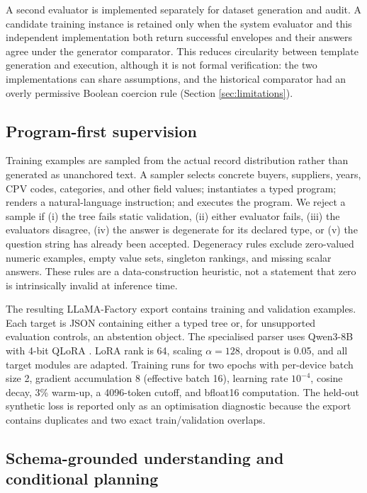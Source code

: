 A second evaluator is implemented separately for dataset generation and audit.  A candidate
training instance is retained only when the system evaluator and this independent implementation
both return successful envelopes and their answers agree under the generator comparator.  This
reduces circularity between template generation and execution, although it is not formal
verification: the two implementations can share assumptions, and the historical comparator had
an overly permissive Boolean coercion rule (Section \ref{sec:limitations}).

\subsection{Program-first supervision}
\label{sec:program-supervision}

Training examples are sampled from the actual record distribution rather than generated as
unanchored text.  A sampler selects concrete buyers, suppliers, years, CPV codes, categories, and
other field values; instantiates a typed program; renders a natural-language instruction; and
executes the program.  We reject a sample if (i) the tree fails static validation, (ii) either
evaluator fails, (iii) the evaluators disagree, (iv) the answer is degenerate for its declared
type, or (v) the question string has already been accepted.  Degeneracy rules exclude zero-valued
numeric examples, empty value sets, singleton rankings, and missing scalar answers.  These rules
are a data-construction heuristic, not a statement that zero is intrinsically invalid at
inference time.

The resulting LLaMA-Factory export contains \TrainN training and \ValN validation examples.
Each target is JSON containing either a typed tree or, for unsupported evaluation controls, an
abstention object.  The specialised parser uses Qwen3-8B \citep{yang2025qwen3} with 4-bit QLoRA
\citep{dettmers2023qlora}.  LoRA rank is 64, scaling $\alpha=128$, dropout is 0.05, and all
target modules are adapted.  Training runs for two epochs with per-device batch size 2,
gradient accumulation 8 (effective batch 16), learning rate $10^{-4}$, cosine decay, 3\%
warm-up, a 4096-token cutoff, and bfloat16 computation.  The held-out synthetic loss is reported
only as an optimisation diagnostic because the export contains duplicates and two exact
train/validation overlaps.

\subsection{Schema-grounded understanding and conditional planning}
\label{sec:understanding-planning}

